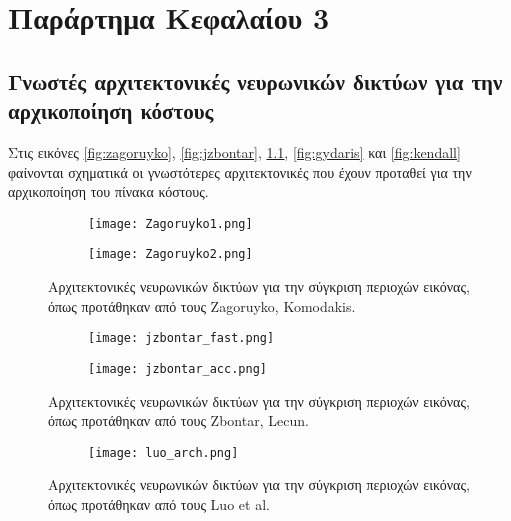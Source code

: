 \g
\chapter{Παράρτημα Κεφαλαίου 3} %

\label{AppendixC} %

\section{Γνωστές αρχιτεκτονικές νευρωνικών δικτύων για την αρχικοποίηση κόστους}
\label{appendix:common_techniques}

Στις εικόνες \ref{fig:zagoruyko}, \ref{fig:jzbontar}, \ref{fig:luo}, \ref{fig:gydaris} και \ref{fig:kendall} φαίνονται σχηματικά οι γνωστότερες αρχιτεκτονικές που έχουν προταθεί για την αρχικοποίηση του πίνακα κόστους.

\begin{figure}
	\centering
	\begin{subfigure}{0.49\textwidth}
		\texttt{[image: Zagoruyko1.png]}
	\end{subfigure}
	\begin{subfigure}{0.49\textwidth}
		\texttt{[image: Zagoruyko2.png]}
	\end{subfigure}
	\caption{Αρχιτεκτονικές νευρωνικών δικτύων για την σύγκριση περιοχών εικόνας, όπως προτάθηκαν από τους \e Zagoruyko, Komodakis. \g \citep{zagoruyko2015learning}}
	\label{fig:zagoruyko}
	
	\begin{subfigure}{0.49\textwidth}
		\texttt{[image: jzbontar\_fast.png]}
	\end{subfigure}
	\begin{subfigure}{0.49\textwidth}
		\texttt{[image: jzbontar\_acc.png]}
	\end{subfigure}
	\caption{Αρχιτεκτονικές νευρωνικών δικτύων για την σύγκριση περιοχών εικόνας, όπως προτάθηκαν από τους \e Zbontar, Lecun. \g \citep{zbontar2016stereo}}
	\label{fig:jzbontar}
	
	\begin{subfigure}{0.8\textwidth}
		\texttt{[image: luo\_arch.png]}
	\end{subfigure}
	\caption{Αρχιτεκτονικές νευρωνικών δικτύων για την σύγκριση περιοχών εικόνας, όπως προτάθηκαν από τους \e Luo et al. \g \citep{Luo}}
	\label{fig:luo}
\end{figure}

